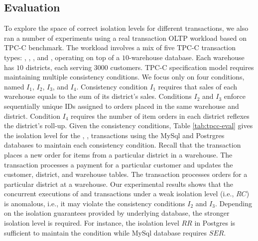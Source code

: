 \subsection{Evaluation}


To explore the space of correct isolation levels for different transactions, we  also  ran a number  of experiments using  a real transaction OLTP workload   based on TPC-C benchmark.  
 The  workload  involves  a mix of five TPC-C transaction types: 
,  ,  ,  and  , 
operating on top of  a $10$-warehouse database.  
Each warehouse has  $10$ districts, each serving $3000$ customers. 
TPC-C  specification model  requires  maintaining multiple   consistency conditions.  We focus only on   four conditions, named $I_1$, $I_2$, $I_3$, and $I_4$.   
Consistency condition $I_1$  requires that  sales of each  warehouse  equals to the  sum of    its  district's sales.  Conditions $I_2$ and $I_3$  enforce  
 sequentially unique IDs assigned to  orders placed in the same   warehouse and district. Condition $I_4$ requires 
 the  number of  item orders   in each district 
  reflexes  the district's roll-up. 
Given the consistency conditions,  Table  \ref{tab:tpcc-eval} gives the isolation level  for the ,  ,   transactions using the  MySql and Postrgres databases   to maintain   each consistency condition. 
Recall that the  transaction places a new order for
 items from a particular district in a warehouse.  
The  transaction  processes  a payment for a particular customer and updates the customer, district, and warehouse tables. 
 The    transaction processes  orders for a particular   district at  a warehouse. 
 Our experimental results  shows that  the concurrent executions of      
    and   transactions under a weak isolation level (i.e.,  $RC$) is anomalous, i.e., it may violate the consistency conditions $I_2$ and $I_3$. Depending on the isolation guarantees provided  by  underlying database,   the stronger  isolation level is required. For instance, the isolation level $RR$ in Postgres  is sufficient to maintain the condition while   MySql database  requires  $SER$. 


